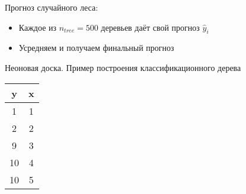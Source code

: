 \documentclass[ignorenonframetext,]{beamer}
\newcommand{\hy}{\hat{y}}
\begin{document}
\begin{frame}{Прогноз случайного леса:}

\begin{itemize}
\item
  Каждое из \(n_{tree}=500\) деревьев даёт свой прогноз \(\hy_i\)
\item
  Усредняем и получаем финальный прогноз
\end{itemize}

\end{frame}

\begin{frame}{Неоновая доска. Пример построения классификационного
дерева}

\begin{longtable}[c]{@{}cc@{}}
\toprule
\begin{minipage}[b]{0.05\columnwidth}\centering\strut
y
\strut\end{minipage} &
\begin{minipage}[b]{0.05\columnwidth}\centering\strut
x
\strut\end{minipage}\tabularnewline
\midrule
\endhead
\begin{minipage}[t]{0.05\columnwidth}\centering\strut
1
\strut\end{minipage} &
\begin{minipage}[t]{0.05\columnwidth}\centering\strut
1
\strut\end{minipage}\tabularnewline
\begin{minipage}[t]{0.05\columnwidth}\centering\strut
2
\strut\end{minipage} &
\begin{minipage}[t]{0.05\columnwidth}\centering\strut
2
\strut\end{minipage}\tabularnewline
\begin{minipage}[t]{0.05\columnwidth}\centering\strut
9
\strut\end{minipage} &
\begin{minipage}[t]{0.05\columnwidth}\centering\strut
3
\strut\end{minipage}\tabularnewline
\begin{minipage}[t]{0.05\columnwidth}\centering\strut
10
\strut\end{minipage} &
\begin{minipage}[t]{0.05\columnwidth}\centering\strut
4
\strut\end{minipage}\tabularnewline
\begin{minipage}[t]{0.05\columnwidth}\centering\strut
10
\strut\end{minipage} &
\begin{minipage}[t]{0.05\columnwidth}\centering\strut
5
\strut\end{minipage}\tabularnewline
\bottomrule
\end{longtable}

\end{frame}
\end{document}
